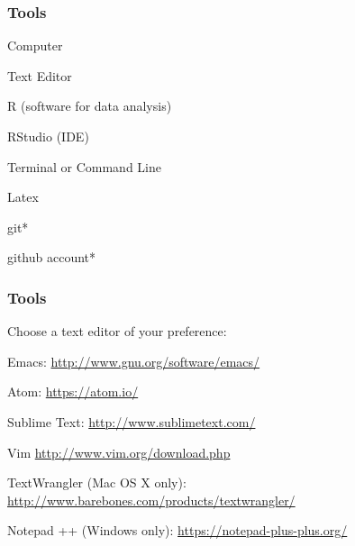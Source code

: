 \documentclass[12pt]{beamer}\usepackage[]{graphicx}\usepackage[]{color}
\begin{document}

\begin{frame}
\begin{center}
\Huge{}
\end{center}
\end{frame}


\begin{frame}
\frametitle{Tools}

\bi
 \item Computer
 \item Text Editor
 \item R (software for data analysis)
 \item RStudio (IDE)
 \item Terminal or Command Line
 \item Latex
 \item git*
 \item github account*
\ei
\eb

\end{frame}


\begin{frame}
\frametitle{Tools}

Choose a text editor of your preference:
\bi
 \item Emacs:
 {\scriptsize \url{http://www.gnu.org/software/emacs/}}
 \item Atom: 
 {\scriptsize \url{https://atom.io/}}
 \item Sublime Text: 
 {\scriptsize \url{http://www.sublimetext.com/}}
 \item Vim 
 {\scriptsize \url{http://www.vim.org/download.php}}
 \item TextWrangler (Mac OS X only): 
 {\scriptsize \url{http://www.barebones.com/products/textwrangler/}}
 \item Notepad ++ (Windows only): 
 {\scriptsize \url{https://notepad-plus-plus.org/}}
\ei
\eb

\end{frame}


\begin{frame}
\begin{center}
\end{center}
\end{frame}
\end{document}
